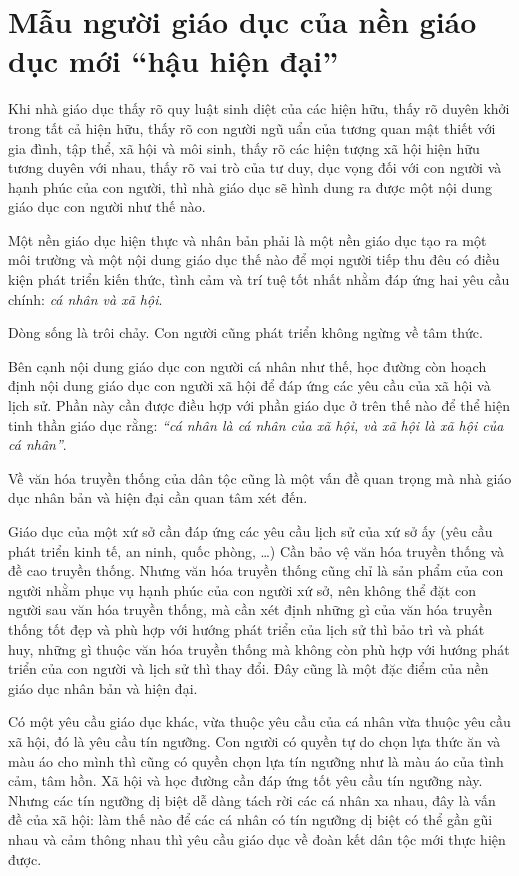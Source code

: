 \chapter{Mẫu người giáo dục của nền giáo dục mới ``hậu hiện đại''} %
\label{cha:mau_nguoi_giao_duc_cua_nen_giao_duc_moi}

Khi nhà giáo dục thấy rõ quy luật sinh diệt của các hiện hữu, thấy rõ duyên khởi trong tất cả hiện hữu, thấy rõ con người ngũ uẩn của tương quan mật thiết với gia đình, tập thể, xã hội và môi sinh, thấy rõ các hiện tượng xã hội hiện hữu tương duyên với nhau, thấy rõ vai trò của tư duy, dục vọng đối với con người và hạnh phúc của con người, thì nhà giáo dục sẽ hình dung ra được một nội dung giáo dục con người như thế nào.

Một nền giáo dục hiện thực và nhân bản phải là một nền giáo dục tạo ra một môi trường và một nội dung giáo dục thế nào để mọi người tiếp thu đêu có điều kiện phát triển kiến thức, tình cảm và trí tuệ tốt nhất nhằm đáp ứng hai yêu cầu chính: \emph{cá nhân và xã hội}.

Dòng sống là trôi chảy. Con người cũng phát triển không ngừng về tâm thức.

Bên cạnh nội dung giáo dục con người cá nhân như thế, học đường còn hoạch định nội dung giáo dục con người xã hội để đáp ứng các yêu cầu của xã hội và lịch sử. Phần này cần được điều hợp với phần giáo dục ở trên thế nào để thể hiện tinh thần giáo dục rằng: \emph{``cá nhân là cá nhân của xã hội, và xã hội là xã hội của cá nhân''}.

Về văn hóa truyền thống của dân tộc cũng là một vấn đề quan trọng mà nhà giáo dục nhân bản và hiện đại cần quan tâm xét đến.

Giáo dục của một xứ sở cần đáp ứng các yêu cầu lịch sử của xứ sở ấy (yêu cầu phát triển kinh tế, an ninh, quốc phòng, \ldots) Cần bảo vệ văn hóa truyền thống và đề cao truyền thống. Nhưng văn hóa truyền thống cũng chỉ là sản phẩm của con người nhằm phục vụ hạnh phúc của con người xứ sở, nên không thể đặt con người sau văn hóa truyền thống, mà cần xét định những gì của văn hóa truyền thống tốt đẹp và phù hợp với hướng phát triển của lịch sử thì bảo trì và phát huy, những gì thuộc văn hóa truyền thống mà không còn phù hợp với hướng phát triển của con người và lịch sử thì thay đổi. Đây cũng là một đặc điểm của nền giáo dục nhân bản và hiện đại.

Có một yêu cầu giáo dục khác, vừa thuộc yêu cầu của cá nhân vừa thuộc yêu cầu xã hội, đó là yêu cầu tín ngưỡng. Con người có quyền tự do chọn lựa thức ăn và màu áo cho mình thì cũng có quyền chọn lựa tín ngưỡng như là màu áo của tình cảm, tâm hồn. Xã hội và học đường cần đáp ứng tốt yêu cầu tín ngưỡng này. Nhưng các tín ngưỡng dị biệt dễ dàng tách rời các cá nhân xa nhau, đây là vấn đề của xã hội: làm thế nào để các cá nhân có tín ngưỡng dị biệt có thể gần gũi nhau và cảm thông nhau thì yêu cầu giáo dục về đoàn kết dân tộc mới thực hiện được.

